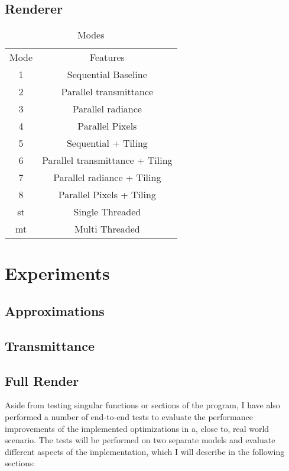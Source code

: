 \documentclass[a4paper, 11pt]{memoir}
\begin{document}
    \section{Renderer}
    \begin{table}[H]
        \centering
        \begin{tabular}{|c|c|}
            \hline
            Mode & Features\\
            1    & Sequential Baseline\\
            2    & Parallel \gls{transmittance}\\
            3    & Parallel \gls{radiance}\\
            4    & Parallel Pixels\\
            5    & Sequential + Tiling\\
            6    & Parallel \gls{transmittance} + Tiling\\
            7    & Parallel \gls{radiance} + Tiling\\
            8    & Parallel Pixels + Tiling\\
            st   & Single Threaded\\
            mt   & Multi Threaded\\
            \hline
        \end{tabular}
        \caption{Modes}
        \label{tab:exec_modes}
    \end{table}
    
    \chapter{Experiments}
    \section{Approximations}
    \section{Transmittance}
    \section{Full Render}
    Aside from testing singular functions or sections of the program, I have also performed a number of end-to-end tests
    to evaluate the performance improvements of the implemented optimizations in a, close to, real world scenario.
    The tests will be performed on two separate models and evaluate different aspects of the implementation,
    which I will describe in the following sections:
\end{document}
